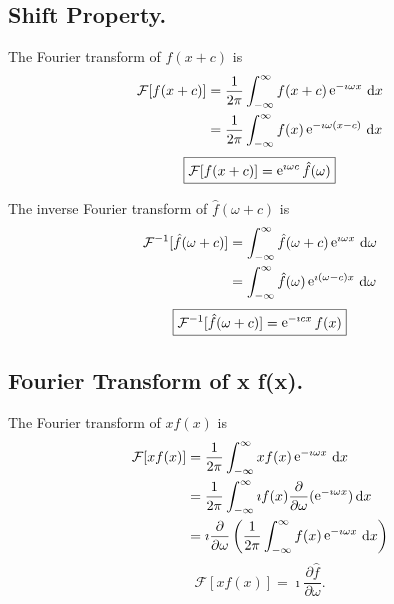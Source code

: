 \subsection{Shift Property.}




The Fourier transform of $f(x+c)$ is
\begin{align*}
  \mathcal{F}[f(x+c)]
  &= \frac{1}{2\pi} \int_{-\infty}^\infty f(x+c) \mathop{\mathrm{e}}\nolimits^{-\imath \omega x}\,\mathrm{d} x 
  \\
  &= \frac{1}{2\pi} \int_{-\infty}^\infty f(x) \mathop{\mathrm{e}}\nolimits^{-\imath \omega (x-c)}\,\mathrm{d} x 
\end{align*}
\[ 
\boxed{ 
  \mathcal{F}[f(x+c)] = \mathop{\mathrm{e}}\nolimits^{\imath \omega c} \hat{f}(\omega)
  } 
\]

The inverse Fourier transform of $\hat{f}(\omega+c)$ is
\begin{align*}
  \mathcal{F}^{-1}[\hat{f}(\omega+c)]
  &= \int_{-\infty}^\infty \hat{f}(\omega+c) \mathop{\mathrm{e}}\nolimits^{\imath \omega x}\,\mathrm{d} \omega 
  \\
  &= \int_{-\infty}^\infty \hat{f}(\omega) \mathop{\mathrm{e}}\nolimits^{\imath (\omega - c) x}\,\mathrm{d} \omega 
\end{align*}
\[ 
\boxed{ 
  \mathcal{F}^{-1}[\hat{f}(\omega+c)] = \mathop{\mathrm{e}}\nolimits^{-\imath c x} f(x)
  } 
\]







\subsection{Fourier Transform of x f(x).}



The Fourier transform of $x f(x)$ is
\begin{align*}
  \mathcal{F}[x f(x)]
  &= \frac{1}{2\pi} \int_{-\infty}^\infty x f(x) \mathop{\mathrm{e}}\nolimits^{-\imath \omega x}\,\mathrm{d} x 
  \\
  &= \frac{1}{2\pi} \int_{-\infty}^\infty \imath f(x) \frac{\partial}{\partial \omega}(\mathop{\mathrm{e}}\nolimits^{-\imath \omega x}) \,\mathrm{d} x 
  \\
  &= \imath \frac{\partial}{\partial \omega} \left( \frac{1}{2\pi} \int_{-\infty}^\infty f(x) \mathop{\mathrm{e}}\nolimits^{-\imath \omega x}\,\mathrm{d} x \right) 
\end{align*}
\[ 
\boxed{ 
  \mathcal{F}[x f(x)] = \imath \frac{\partial \hat{f}}{\partial \omega}.
  } 
\]

